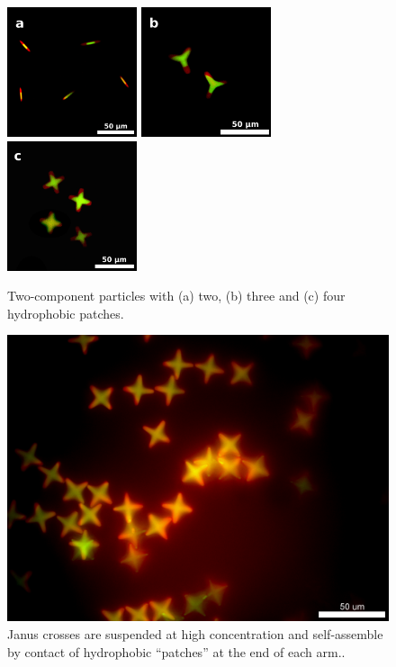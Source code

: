 \begin{figure}[h]
\begin{center}
\includegraphics[height=1.5in]{figures/complex-shapes/two-patch-rods-single-image.png} \includegraphics[height=1.5in]{figures/complex-shapes/janus-threepatch-single-image.png} \includegraphics[height=1.5in]{figures/complex-shapes/janus-crosses-single-image.png}
\end{center}
\caption{Two-component particles with (a) two, (b) three and (c) four hydrophobic patches.}
\label{fig:branched-series}
\end{figure}

\begin{figure}[h]
\begin{center}
\includegraphics[width=0.6\linewidth]{figures/complex-shapes/crosses-high-conc.png}
\end{center}
\caption{Janus crosses are suspended at high concentration and self-assemble by contact
of hydrophobic ``patches'' at the end of each arm..}
\label{fig:crosses-high-conc}
\end{figure}

